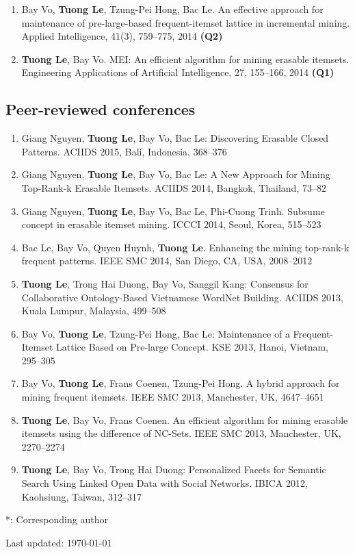 \documentclass[letterpaper]{article}
\begin{document}
\begin{enumerate}
\item Bay Vo, \textbf{Tuong Le}, Tzung-Pei Hong, Bac Le. An effective approach for maintenance of pre-large-based frequent-itemset lattice in incremental mining. Applied Intelligence, 41(3), 759--775, 2014 \textbf{(Q2)}

\item \textbf{Tuong Le}, Bay Vo. MEI: An efficient algorithm for mining erasable itemsets. Engineering Applications of Artificial Intelligence, 27, 155--166, 2014 \textbf{(Q1)}

\end{enumerate}

\subsection*{Peer-reviewed conferences}

\begin{enumerate}

\item Giang Nguyen, \textbf{Tuong Le}, Bay Vo, Bac Le: Discovering Erasable Closed Patterns. ACIIDS 2015, Bali, Indonesia, 368--376

\item Giang Nguyen, \textbf{Tuong Le}, Bay Vo, Bac Le: A New Approach for Mining Top-Rank-k Erasable Itemsets. ACIIDS 2014, Bangkok, Thailand, 73--82

\item Giang Nguyen, \textbf{Tuong Le}, Bay Vo, Bac Le, Phi-Cuong Trinh. Subsume concept in erasable itemset mining. ICCCI 2014, Seoul, Korea, 515--523

\item Bac Le, Bay Vo, Quyen Huynh, \textbf{Tuong Le}. Enhancing the mining top-rank-k frequent patterns. IEEE SMC 2014, San Diego, CA, USA, 2008--2012

\item \textbf{Tuong Le}, Trong Hai Duong, Bay Vo, Sanggil Kang: Consensus for Collaborative Ontology-Based Vietnamese WordNet Building. ACIIDS 2013, Kuala Lumpur, Malaysia, 499--508

\item Bay Vo, \textbf{Tuong Le}, Tzung-Pei Hong, Bac Le: Maintenance of a Frequent-Itemset Lattice Based on Pre-large Concept. KSE 2013, Hanoi, Vietnam, 295--305

\item Bay Vo, \textbf{Tuong Le}, Frans Coenen, Tzung-Pei Hong. A hybrid approach for mining frequent itemsets. IEEE SMC 2013, Manchester, UK, 4647--4651

\item \textbf{Tuong Le}, Bay Vo, Frans Coenen. An efficient algorithm for mining erasable itemsets using the difference of NC-Sets. IEEE SMC 2013, Manchester, UK, 2270--2274

\item \textbf{Tuong Le}, Bay Vo, Trong Hai Duong:
Personalized Facets for Semantic Search Using Linked Open Data with Social Networks. IBICA 2012, Kaohsiung, Taiwan, 312--317

\end{enumerate}

*: Corresponding author

\bigskip

\begin{center}
  \begin{footnotesize}
    Last updated: \today 
  \end{footnotesize}
\end{center}
\end{document}
